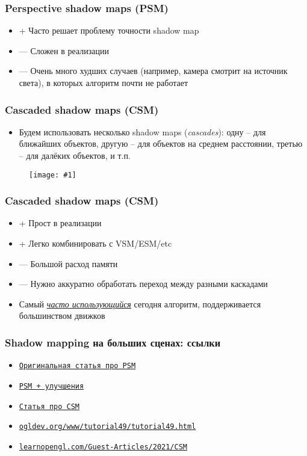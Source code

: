 \documentclass{beamer}
\newcommand{\slideimage}[1]{
  \begin{figure}
    \begin{adjustbox}{width=\textwidth, totalheight=\textheight-2\baselineskip-2\baselineskip,keepaspectratio}
      \texttt{[image: \#1]}
    \end{adjustbox}
  \end{figure}
}
\begin{document}
\begin{frame}[fragile]
\frametitle{Perspective shadow maps (PSM)}
\begin{itemize}
\item {\color{green}+} Часто решает проблему точности shadow map
\item {\color{red}—} Сложен в реализации
\item {\color{red}—} Очень много худших случаев (например, камера смотрит на источник света), в которых алгоритм почти не работает
\end{itemize}
\end{frame}

\begin{frame}[fragile]
\frametitle{Cascaded shadow maps (CSM)}
\begin{itemize}
\item Будем использовать несколько shadow maps (\textit{cascades}): одну -- для ближайших объектов, другую -- для объектов на среднем расстоянии, третью -- для далёких объектов, и т.п.
\end{itemize}
\slideimage{csm.jpg}
\end{frame}

\begin{frame}[fragile]
\frametitle{Cascaded shadow maps (CSM)}
\begin{itemize}
\item {\color{green}+} Прост в реализации
\item {\color{green}+} Легко комбинировать с VSM/ESM/etc
\item {\color{red}—} Большой расход памяти
\item {\color{red}—} Нужно аккуратно обработать переход между разными каскадами
\item Самый \textit{\underline{часто использующийся}} сегодня алгоритм, поддерживается большинством движков
\end{itemize}
\end{frame}

\begin{frame}[fragile]
\frametitle{Shadow mapping на больших сценах: ссылки}
\begin{itemize}
\item \href{https://www-sop.inria.fr/reves/Basilic/2002/SD02/PerspectiveShadowMaps.pdf}{\texttt{Оригинальная статья про PSM}}
\item \href{https://developer.download.nvidia.com/books/HTML/gpugems/gpugems_ch14.html}{\texttt{PSM + улучшения}}
\item \href{https://developer.download.nvidia.com/SDK/10.5/opengl/src/cascaded_shadow_maps/doc/cascaded_shadow_maps.pdf}{\texttt{Статья про CSM}}
\item \href{https://ogldev.org/www/tutorial49/tutorial49.html}{\texttt{ogldev.org/www/tutorial49/tutorial49.html}}
\item \href{https://learnopengl.com/Guest-Articles/2021/CSM}{\texttt{learnopengl.com/Guest-Articles/2021/CSM}}
\end{itemize}
\end{frame}
\end{document}
